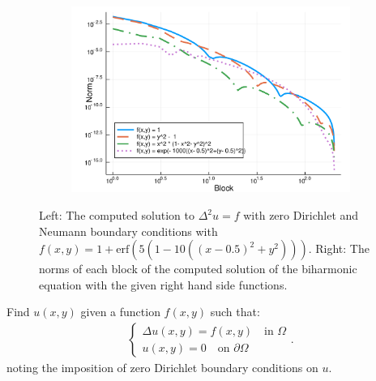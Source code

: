 \documentclass[11pt, oneside]{article}   	%
\begin{document}
\begin{figure}[t]
	\begin{subfigure}{0.5\textwidth}
	\includegraphics[scale=0.5]{solutionblocknorms-biharmonic}
	\centering
	\end{subfigure}
	\caption{Left: The computed solution to $\Delta^2 u = f$ with zero Dirichlet and Neumann boundary conditions with $f(x,y) = 1 + \text{erf}(5(1 - 10((x - 0.5)^2 + y^2)))$. Right: The norms of each block of the computed solution of the biharmonic equation with the given right hand side functions.}
	\centering
	\label{fig:biharmonic}
\end{figure}

Find \(u(x,y)\) given a function \(f(x,y)\) such that:
\begin{align}
	\begin{cases}
    		\Delta u(x,y) = f(x,y) \quad \text{in } \Omega \\
		u(x,y) = 0 \quad \text{on } \partial \Omega
	\end{cases}.
	\label{eqn:poisson}
\end{align}
noting the imposition of zero Dirichlet boundary conditions on $u$.
\end{document}
